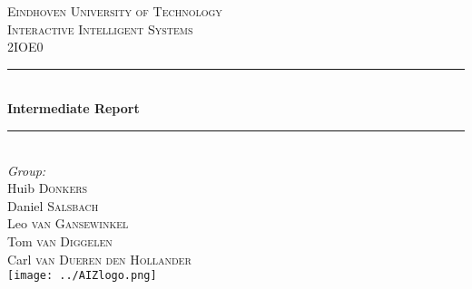 \documentclass[12pt]{report}
\begin{document}
\begin{titlepage}

\newcommand{\HRule}{\rule{\linewidth}{0.5mm}} %

\center %
 

\textsc{\LARGE Eindhoven University of Technology}\\[1.5cm] %
\textsc{\Large Interactive Intelligent Systems}\\[0.5cm] %
\textsc{\large 2IOE0}\\[0.5cm] %


\HRule \\[0.4cm]
{ \huge \bfseries Intermediate Report}\\[0.4cm] %
\HRule \\[1.5cm]
 

\Large \emph{Group:}\\
Huib \textsc{Donkers}\\ %
Daniel \textsc{Salsbach}\\ %
Leo \textsc{van Gansewinkel}\\ %
Tom \textsc{van Diggelen}\\ %
Carl \textsc{van Dueren den Hollander}\\[.25cm] %


\texttt{[image: ../AIZlogo.png]}\\[.25cm] %
 

\end{titlepage}
\end{document}
